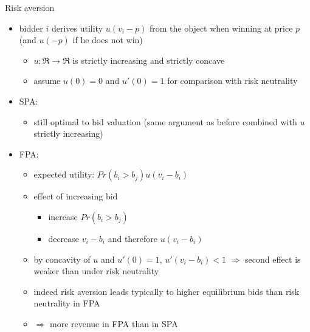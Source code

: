 \documentclass[bigger]{beamer}
\newcommand{\Ra}{\Rightarrow} \newcommand{\ra}{\rightarrow} \newcommand{\Lra}{\Leftrightarrow}
\begin{document}
\begin{frame}[label={sec:orgfb3d48f}]{Risk aversion}
\begin{itemize}
\item bidder \(i\) derives utility \(u(v_i-p)\) from the object when winning at price \(p\) (and \(u(-p)\) if he does not win)
\begin{itemize}
\item \(u:\Re\rightarrow\Re\) is strictly increasing and strictly concave
\item assume \(u(0)=0\) and \(u'(0)=1\) for comparison with risk neutrality
\end{itemize}
\item SPA:
\begin{itemize}
\item still optimal to bid valuation (same argument as before combined with \(u\) strictly increasing)
\end{itemize}
\item FPA:
\begin{itemize}
\item expected utility: \(Pr(b_i>b_j)u(v_i-b_i)\)
\item effect of increasing bid
\begin{itemize}
\item increase \(Pr(b_i>b_j)\)
\item decrease \(v_i-b_i\) and therefore \(u(v_i-b_i)\)
\end{itemize}
\item by concavity of \(u\) and \(u'(0)=1\), \(u'(v_i-b_i)<1\) \linebreak \(\Ra\) second effect is weaker than under risk neutrality
\item indeed risk aversion leads typically to higher equilibrium bids than risk neutrality in FPA
\item \(\Ra\) more revenue in FPA than in SPA
\end{itemize}
\end{itemize}
\end{frame}
\end{document}
